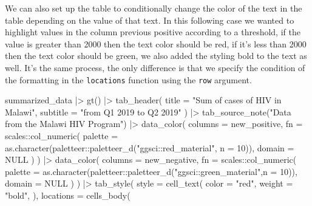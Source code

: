 \documentclass[
]{article}
\newenvironment{Shaded}{\begin{snugshade}}{\end{snugshade}}
\newcommand{\AttributeTok}[1]{\textcolor[rgb]{0.77,0.63,0.00}{#1}}
\newcommand{\ConstantTok}[1]{\textcolor[rgb]{0.00,0.00,0.00}{#1}}
\newcommand{\DecValTok}[1]{\textcolor[rgb]{0.00,0.00,0.81}{#1}}
\newcommand{\FunctionTok}[1]{\textcolor[rgb]{0.00,0.00,0.00}{#1}}
\newcommand{\NormalTok}[1]{#1}
\newcommand{\SpecialCharTok}[1]{\textcolor[rgb]{0.00,0.00,0.00}{#1}}
\newcommand{\StringTok}[1]{\textcolor[rgb]{0.31,0.60,0.02}{#1}}
\begin{document}
We can also set up the table to conditionally change the color of the
text in the table depending on the value of that text. In this following
case we wanted to highlight values in the column previous positive
according to a threshold, if the value is greater than 2000 then the
text color should be red, if it's less than 2000 then the text color
should be green, we also added the styling bold to the text as well.
It's the same process, the only difference is that we specify the
condition of the formatting in the \texttt{locations} function using the
\texttt{row} argument.

\begin{Shaded}
\begin{Highlighting}[]
\NormalTok{summarized\_data }\SpecialCharTok{|\textgreater{}} 
  \FunctionTok{gt}\NormalTok{() }\SpecialCharTok{|\textgreater{}} 
  \FunctionTok{tab\_header}\NormalTok{(}
    \AttributeTok{title =} \StringTok{"Sum of cases of HIV in Malawi"}\NormalTok{,}
    \AttributeTok{subtitle =} \StringTok{"from Q1 2019 to Q2 2019"}
\NormalTok{  ) }\SpecialCharTok{|\textgreater{}} 
  \FunctionTok{tab\_source\_note}\NormalTok{(}\StringTok{"Data from the Malawi HIV Program"}\NormalTok{) }\SpecialCharTok{|\textgreater{}} 
  \FunctionTok{data\_color}\NormalTok{(}
    \AttributeTok{columns =}\NormalTok{ new\_positive,}
    \AttributeTok{fn =}\NormalTok{ scales}\SpecialCharTok{::}\FunctionTok{col\_numeric}\NormalTok{(}
      \AttributeTok{palette =} \FunctionTok{as.character}\NormalTok{(paletteer}\SpecialCharTok{::}\FunctionTok{paletteer\_d}\NormalTok{(}\StringTok{"ggsci::red\_material"}\NormalTok{, }\AttributeTok{n =} \DecValTok{10}\NormalTok{)),}
      \AttributeTok{domain =} \ConstantTok{NULL}
\NormalTok{    )}
\NormalTok{  ) }\SpecialCharTok{|\textgreater{}} 
  \FunctionTok{data\_color}\NormalTok{(}
    \AttributeTok{columns =}\NormalTok{ new\_negative,}
    \AttributeTok{fn =}\NormalTok{ scales}\SpecialCharTok{::}\FunctionTok{col\_numeric}\NormalTok{(}
      \AttributeTok{palette =} \FunctionTok{as.character}\NormalTok{(paletteer}\SpecialCharTok{::}\FunctionTok{paletteer\_d}\NormalTok{(}\StringTok{"ggsci::green\_material"}\NormalTok{,}\AttributeTok{n =} \DecValTok{10}\NormalTok{)),}
      \AttributeTok{domain =} \ConstantTok{NULL}
\NormalTok{    )}
\NormalTok{  ) }\SpecialCharTok{|\textgreater{}} 
  \FunctionTok{tab\_style}\NormalTok{(}
    \AttributeTok{style =} \FunctionTok{cell\_text}\NormalTok{(}
      \AttributeTok{color =} \StringTok{"red"}\NormalTok{,}
      \AttributeTok{weight =} \StringTok{"bold"}\NormalTok{,}
\NormalTok{    ),}
    \AttributeTok{locations =} \FunctionTok{cells\_body}\NormalTok{(}

\end{Highlighting}
\end{Shaded}
\end{document}
